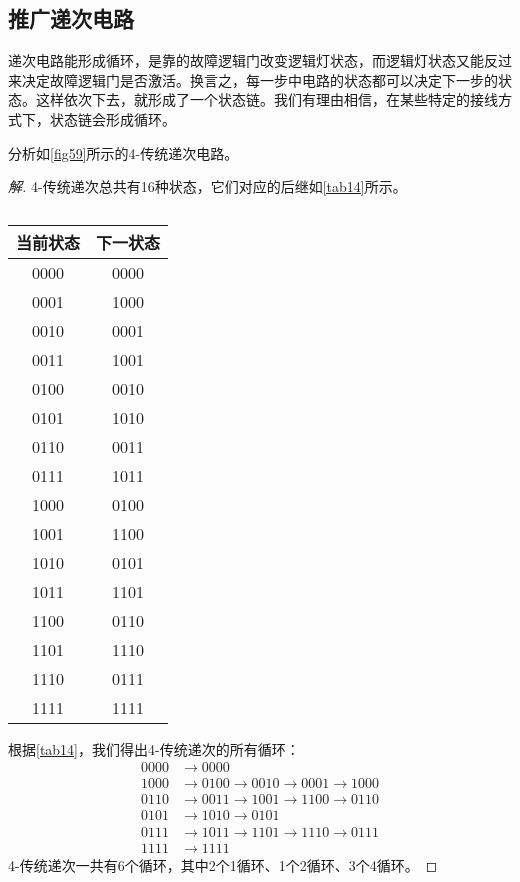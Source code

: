 \subsection{推广递次电路}
递次电路能形成循环，是靠的故障逻辑门改变逻辑灯状态，而逻辑灯状态又能反过来决定故障逻辑门是否激活。换言之，每一步中电路的状态都可以决定下一步的状态。这样依次下去，就形成了一个状态链。我们有理由相信，在某些特定的接线方式下，状态链会形成循环。

\begin{example}{}{}
分析如\autoref{fig59}所示的4-传统递次电路。
\begin{figure}[H]
\centering
{}
\caption{}\label{fig59}
\end{figure}
\begin{proof}[解]
4-传统递次总共有16种状态，它们对应的后继如\autoref{tab14}所示。
\begin{table}[H]
\centering
\begin{tabular}{|c|c|}
\hline
当前状态&下一状态\\\hline
0000&0000\\\hline
0001&1000\\\hline
0010&0001\\\hline
0011&1001\\\hline
0100&0010\\\hline
0101&1010\\\hline
0110&0011\\\hline
0111&1011\\\hline
1000&0100\\\hline
1001&1100\\\hline
1010&0101\\\hline
1011&1101\\\hline
1100&0110\\\hline
1101&1110\\\hline
1110&0111\\\hline
1111&1111\\\hline
\end{tabular}
\caption{}\label{tab14}
\end{table}

根据\autoref{tab14}，我们得出4-传统递次的所有循环：
\begin{align*}
0000&\to 0000\\
1000&\to 0100\to 0010\to 0001\to 1000\\
0110&\to 0011\to 1001\to 1100\to 0110\\
0101&\to 1010\to 0101\\
0111&\to 1011\to 1101\to 1110\to 0111\\
1111&\to 1111
\end{align*}
4-传统递次一共有6个循环，其中2个1循环、1个2循环、3个4循环。
\end{proof}
\end{example}


